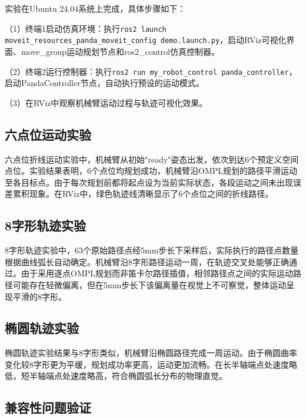 \documentclass[a4paper,12pt]{ctexart}
\newcommand{\bodytext}{\fontsize{12pt}{20pt}\selectfont\setlength{\parskip}{0pt}}
\begin{document}
\bodytext

实验在Ubuntu 24.04系统上完成，具体步骤如下：

（1）终端1启动仿真环境：执行\texttt{ros2 launch moveit\_resources\_panda\_moveit\_config demo.launch.py}，启动RViz可视化界面、move\_group运动规划节点和ros2\_control仿真控制器。

（2）终端2运行控制器：执行\texttt{ros2 run my\_robot\_control panda\_controller}，启动PandaController节点，自动执行预设的运动模式。

（3）在RViz中观察机械臂运动过程与轨迹可视化效果。

\subsection{六点位运动实验}

\bodytext

六点位折线运动实验中，机械臂从初始"ready"姿态出发，依次到达6个预定义空间点位。实验结果表明，6个点位均规划成功，机械臂沿OMPL规划的路径平滑运动至各目标点。由于每次规划前都将起点设为当前实际状态，各段运动之间未出现误差累积现象。在RViz中，绿色轨迹线清晰显示了6个点位之间的折线路径。

\subsection{8字形轨迹实验}

\bodytext

8字形轨迹实验中，63个原始路径点经5mm步长下采样后，实际执行的路径点数量根据曲线弧长自动确定。机械臂沿8字形路径运动一周，在轨迹交叉处能够正确通过。由于采用逐点OMPL规划而非笛卡尔路径插值，相邻路径点之间的实际运动路径可能存在轻微偏离，但在5mm步长下该偏离量在视觉上不可察觉，整体运动呈现平滑的8字形。

\subsection{椭圆轨迹实验}

\bodytext

椭圆轨迹实验结果与8字形类似，机械臂沿椭圆路径完成一周运动。由于椭圆曲率变化较8字形更为平缓，规划成功率更高，运动更加流畅。在长半轴端点处速度略低，短半轴端点处速度略高，符合椭圆弧长分布的物理直觉。

\subsection{兼容性问题验证}

\bodytext
\end{document}
